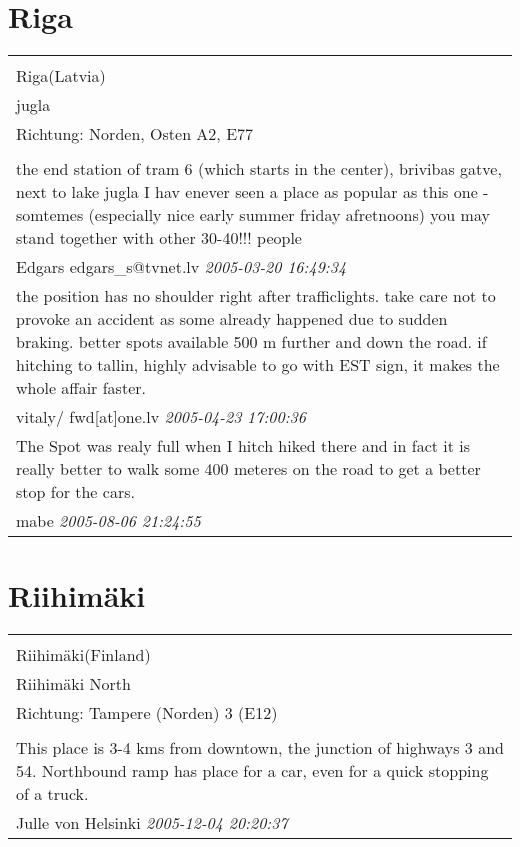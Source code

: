 \documentclass[a4paper,12pt]{article}
\begin{document}
\section{Riga}
\begin{tabular}{|p{13cm}|}
\hline\\
Riga(Latvia)\\
jugla\\
Richtung: Norden, Osten A2, E77 \\
\hline\\
the end station of tram 6 (which starts in the center), brivibas gatve, next to lake jugla
I hav enever seen a place as popular as this one - somtemes (especially nice early summer friday afretnoons) you may stand together with other 30-40!!! people \\
Edgars edgars\_s@tvnet.lv \textit{ 2005-03-20 16:49:34 }\\\hline the position has no shoulder right after trafficlights. take care not to provoke an accident as some already happened due to sudden braking. better spots available 500 m further and down the road. if hitching to tallin, highly advisable to go with EST sign, it makes the whole affair faster. \\
vitaly/ fwd[at]one.lv \textit{ 2005-04-23 17:00:36 }\\\hline The Spot was realy full when I hitch hiked there and in fact it is really better to walk some 400 meteres on the road to get a better stop for the cars. \\
mabe \textit{ 2005-08-06 21:24:55 }\\\hline
\end{tabular}


\section{Riihimäki}
\begin{tabular}{|p{13cm}|}
\hline\\
Riihimäki(Finland)\\
Riihimäki North\\
Richtung: Tampere (Norden) 3 (E12) \\
\hline\\
This place is 3-4 kms from downtown, the junction of highways 3 and 54. Northbound ramp has place for a car, even for a quick stopping of a truck. \\
Julle von Helsinki \textit{ 2005-12-04 20:20:37 }\\\hline
\end{tabular}
\end{document}

